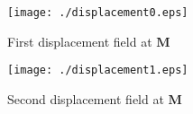 \documentclass[12pt, fleqn]{article}
\begin{document}
\begin{figure}[h]
    \begin{center}
        \texttt{[image: ./displacement0.eps]}
    \end{center}
    \caption{First displacement field at $\mathbf{M}$}
    \label{fig:disp0}
\end{figure}

\begin{figure}[h]
    \begin{center}
        \texttt{[image: ./displacement1.eps]}
    \end{center}
    \caption{Second displacement field at $\mathbf{M}$}
    \label{fig:disp1}
\end{figure}
\end{document}
